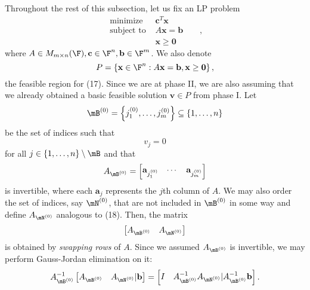 \documentclass{article}
\renewcommand{\vec}{\mathbf}
\begin{document}
Throughout the rest of this subsection, let us fix an LP problem
\begin{equation}
    \begin{aligned}
        \text{minimize } & \vec{c}^{T}\vec{x} && \\
        \text{subject to } & A\vec{x}=\vec{b}&&\\
                           & \vec{x}\geq \vec{0}
    \end{aligned},
\end{equation}
where $A\in M_{m\times n}(\F), \vec{c}\in\F^n, \vec{b}\in\F^m$. We also denote
\begin{equation*}
    P = \left\lbrace \vec{x}\in\F^n: A\vec{x}=\vec{b},\vec{x}\geq\vec{0} \right\rbrace ,
\end{equation*}
the feasible region for (17). Since we are at phase II, we are also assuming that we already obtained a basic feasible solution $\vec{v}\in P$ from phase I. Let 
\begin{equation*}
    \mB^{\left( 0 \right) } = \left\lbrace j_1^{\left( 0 \right) },\ldots,j_m^{\left( 0 \right) } \right\rbrace \subseteq \left\lbrace 1,\ldots,n \right\rbrace
\end{equation*}
be the set of indices such that
\begin{equation*}
    v_j = 0
\end{equation*}
for all $j\in\left\lbrace 1,\ldots,n \right\rbrace \setminus \mB$ and that
\begin{equation}
    A_{\mB^{\left( 0 \right) }} = 
    \begin{bmatrix} \vec{a}_{j_1^{\left( 0 \right) }}&\cdots&\vec{a}_{j_m^{\left( 0 \right) }} \end{bmatrix} 
\end{equation}
is invertible, where each $\vec{a}_j$ represents the $j$th column of $A$. We may also order the set of indices, say $\mN^{\left( 0 \right) }$, that are not included in $\mB^{\left( 0 \right) }$ in some way and define $A_{\mN^{\left( 0 \right) }}$ analogous to (18). Then, the matrix
\begin{equation*}
    \begin{bmatrix} A_{\mB^{\left( 0 \right) }} & A_{\mN^{\left( 0 \right) }}\end{bmatrix} 
\end{equation*}
is obtained by \textit{swapping rows} of $A$. Since we assumed $A_{\mB^{\left( 0 \right) }}$ is invertible, we may perform Gauss-Jordan elimination on it:
\begin{equation*}
    A_{\mB^{\left( 0 \right) }}^{-1} \begin{bmatrix} A_{\mB^{\left( 0 \right) }} & A_{\mN^{\left( 0 \right) }}|\vec{b}\end{bmatrix} = \begin{bmatrix} I & A_{\mB^{\left( 0 \right) }}^{-1} A_{\mN^{\left( 0 \right) }} |A_{\mB^{\left( 0 \right)}}^{-1} \vec{b}\end{bmatrix} .
\end{equation*}
\end{document}
